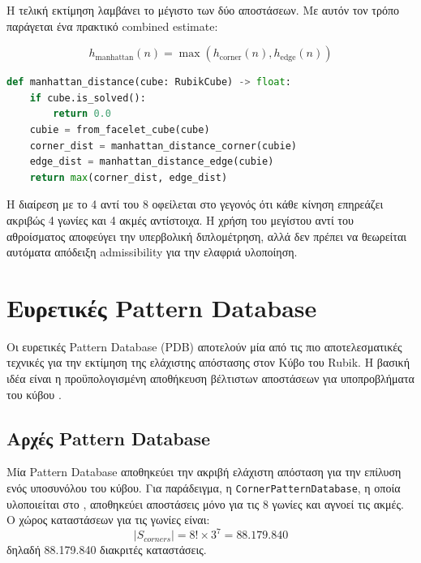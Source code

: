 Η τελική εκτίμηση λαμβάνει το μέγιστο των δύο αποστάσεων. Με αυτόν τον τρόπο
παράγεται ένα πρακτικό combined estimate:

\begin{equation}
\label{eq:manhattan-combined}
h_{\text{manhattan}}(n) = \max(h_{\text{corner}}(n), h_{\text{edge}}(n))
\end{equation}

\begin{lstlisting}[language=Python, caption={Συνδυασμένη απόσταση Manhattan (src/korf/heuristics.py:166-189)}]
def manhattan_distance(cube: RubikCube) -> float:
    if cube.is_solved():
        return 0.0
    cubie = from_facelet_cube(cube)
    corner_dist = manhattan_distance_corner(cubie)
    edge_dist = manhattan_distance_edge(cubie)
    return max(corner_dist, edge_dist)
\end{lstlisting}

Η διαίρεση με το 4 αντί του 8 οφείλεται στο γεγονός ότι κάθε κίνηση επηρεάζει
ακριβώς 4 γωνίες και 4 ακμές αντίστοιχα. Η χρήση του μεγίστου αντί του
αθροίσματος αποφεύγει την υπερβολική διπλομέτρηση, αλλά δεν πρέπει να
θεωρείται αυτόματα απόδειξη admissibility για την ελαφριά υλοποίηση.

\section{Ευρετικές Pattern Database}
\label{sec:pattern-databases}

Οι ευρετικές Pattern Database (PDB) αποτελούν μία από τις πιο αποτελεσματικές τεχνικές για την εκτίμηση της ελάχιστης απόστασης στον Κύβο του Rubik. Η βασική ιδέα είναι η προϋπολογισμένη αποθήκευση βέλτιστων αποστάσεων για υποπροβλήματα του κύβου \cite{culberson1998pattern}.

\subsection{Αρχές Pattern Database}
\label{subsec:pdb-principles}

Μία Pattern Database αποθηκεύει την ακριβή ελάχιστη απόσταση για την επίλυση ενός υποσυνόλου του κύβου. Για παράδειγμα, η \texttt{CornerPatternDatabase}, η οποία υλοποιείται στο , αποθηκεύει αποστάσεις μόνο για τις 8 γωνίες και αγνοεί τις ακμές. Ο χώρος καταστάσεων για τις γωνίες είναι:
\begin{equation}
|S_{corners}| = 8! \times 3^7 = 88.179.840
\end{equation}
δηλαδή 88.179.840 διακριτές καταστάσεις.

